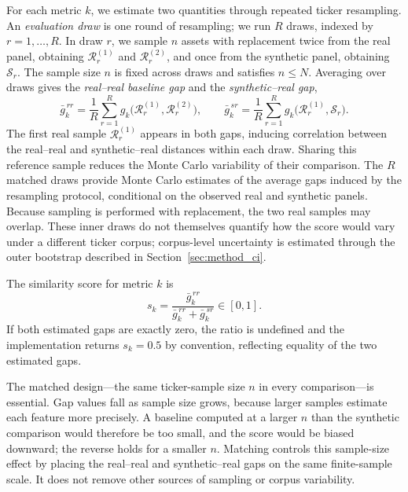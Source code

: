For each metric $k$, we estimate two quantities through repeated ticker
resampling.
An \emph{evaluation draw} is one round of resampling; we run $R$ draws,
indexed by $r=1,\ldots,R$.
In draw $r$, we sample $n$ assets with replacement twice from the real
panel, obtaining $\mathcal{R}_r^{(1)}$ and
$\mathcal{R}_r^{(2)}$, and once from the synthetic panel, obtaining
$\mathcal{S}_r$.
The sample size $n$ is fixed across draws and satisfies $n\leq N$.
Averaging over draws gives the \emph{real--real baseline gap} and the
\emph{synthetic--real gap},
\begin{equation}
  \bar{g}^{\,rr}_k
  = \frac{1}{R} \sum_{r=1}^{R}
    g_k\bigl(\mathcal{R}_r^{(1)}, \mathcal{R}_r^{(2)}\bigr),
  \qquad
  \bar{g}^{\,sr}_k
  = \frac{1}{R} \sum_{r=1}^{R}
    g_k\bigl(\mathcal{R}_r^{(1)}, \mathcal{S}_r\bigr).
  \label{eq:gaps}
\end{equation}
The first real sample $\mathcal{R}_r^{(1)}$ appears in both gaps, inducing correlation between the real–real and synthetic–real distances within each draw.
Sharing this reference sample reduces the Monte Carlo variability of their comparison. The $R$ matched draws provide Monte Carlo estimates of the average gaps induced by the resampling protocol, conditional on the observed real and synthetic panels.
Because sampling is performed with replacement, the two real samples may overlap.
These inner draws do not themselves quantify how the score would vary under a different ticker corpus; corpus-level uncertainty is estimated through the outer bootstrap described in Section~\ref{sec:method_ci}.

The similarity score for metric $k$ is
\begin{equation}
  s_k
  = \frac{\bar{g}^{\,rr}_k}{\bar{g}^{\,rr}_k + \bar{g}^{\,sr}_k}
  \in [0, 1].
  \label{eq:score}
\end{equation}
If both estimated gaps are exactly zero, the ratio is undefined and the
implementation returns $s_k=0.5$ by convention, reflecting equality of the
two estimated gaps.

The matched design---the same ticker-sample size $n$ in every
comparison---is essential.
Gap values fall as sample size grows, because larger samples estimate
each feature more precisely.
A baseline computed at a larger $n$ than the synthetic comparison would
therefore be too small, and the score would be biased downward; the
reverse holds for a smaller $n$.
Matching controls this sample-size effect by placing the real–real and synthetic–real gaps on the same finite-sample scale. It does not remove other sources of sampling or corpus variability.

